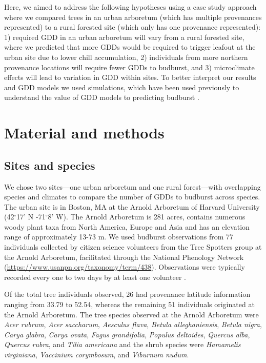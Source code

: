 \documentclass{article}\usepackage[]{graphicx}\usepackage[]{color}
\begin{document}
Here, we aimed to address the following hypotheses using a case study approach where we compared trees in an urban arboretum (which has multiple provenances represented) to a rural forested site (which only has one provenance represented): 1) required GDD in an urban arboretum will vary from a rural forested site, where we predicted that more GDDs would be required to trigger leafout at the urban site due to lower chill accumulation, 2) individuals from more northern provenance locations will require fewer GDDs to budburst, and 3) microclimate effects will lead to variation in GDD within sites. To better interpret our results and GDD models we used simulations, which have been used previously to understand the value of GDD models to predicting budburst \citep[e.g.,][]{Hunter1992}.

\section{Material and methods}
\subsection{Sites and species}
We chose two sites---one urban arboretum and one rural forest---with overlapping species and climates to compare the number of GDDs to budburst across species. The urban site is in Boston, MA at the Arnold Arboretum of Harvard University (42$^{\circ}$17' N -71$^{\circ}$8' W). The Arnold Arboretum is 281 acres, contains numerous woody plant taxa from North America, Europe and Asia and has an elevation range of approximately 13-73 m. We used budburst observations \citep[i.e., defined as the `beginning of sprouting or bud breaking; shoot emergence' as BBCH scale 07, see][]{Finn2007} from 77 individuals collected by citizen science volunteers from the Tree Spotters group at the Arnold Arboretum, facilitated through the National Phenology Network (\url{https://www.usanpn.org/taxonomy/term/438}). Observations were typically recorded every one to two days by at least one volunteer \citep{Denny2014}.

Of the total tree individuals observed, 26 had provenance latitude information ranging from 33.79 to 52.54, whereas the remaining 51 individuals originated at the Arnold Arboretum. The tree species observed at the Arnold Arboretum were \textit{Acer rubrum}, \textit{Acer saccharum}, \textit{Aesculus flava}, \textit{Betula alleghaniensis}, \textit{Betula nigra}, \textit{Carya glabra}, \textit{Carya ovata}, \textit{Fagus grandifolia}, \textit{Populus deltoides}, \textit{Quercus alba}, \textit{Quercus rubra}, and \textit{Tilia americana} and the shrub species were \textit{Hamamelis virginiana}, \textit{Vaccinium corymbosum}, and \textit{Viburnum nudum}. 
\end{document}

